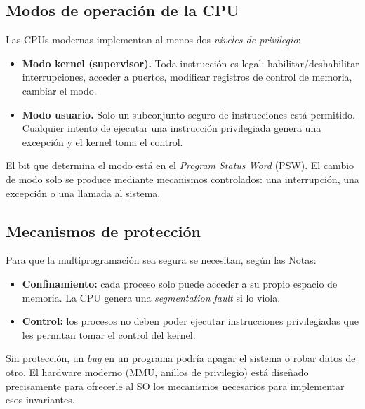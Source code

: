 \documentclass[11pt,a4paper]{article}
\begin{document}
\subsection{Modos de operación de la CPU}

Las CPUs modernas implementan al menos dos \emph{niveles de privilegio}:

\begin{itemize}[leftmargin=*]
    \item \textbf{Modo kernel (supervisor).} Toda instrucción es legal:
        habilitar/deshabilitar interrupciones, acceder a puertos,
        modificar registros de control de memoria, cambiar el modo.
    \item \textbf{Modo usuario.} Solo un subconjunto seguro de
        instrucciones está permitido. Cualquier intento de ejecutar una
        instrucción privilegiada genera una excepción y el kernel toma
        el control.
\end{itemize}

El bit que determina el modo está en el \emph{Program Status Word}
(PSW). El cambio de modo solo se produce mediante mecanismos
controlados: una interrupción, una excepción o una llamada al sistema.

\subsection{Mecanismos de protección}

Para que la multiprogramación sea segura se necesitan, según las Notas:

\begin{itemize}[leftmargin=*]
    \item \textbf{Confinamiento:} cada proceso solo puede acceder a su
        propio espacio de memoria. La CPU genera una \emph{segmentation
        fault} si lo viola.
    \item \textbf{Control:} los procesos no deben poder ejecutar
        instrucciones privilegiadas que les permitan tomar el control
        del kernel.
\end{itemize}

\begin{idea}
Sin protección, un \emph{bug} en un programa podría apagar el sistema o
robar datos de otro. El hardware moderno (MMU, anillos de privilegio)
está diseñado precisamente para ofrecerle al SO los mecanismos
necesarios para implementar esos invariantes.
\end{idea}

\end{document}
